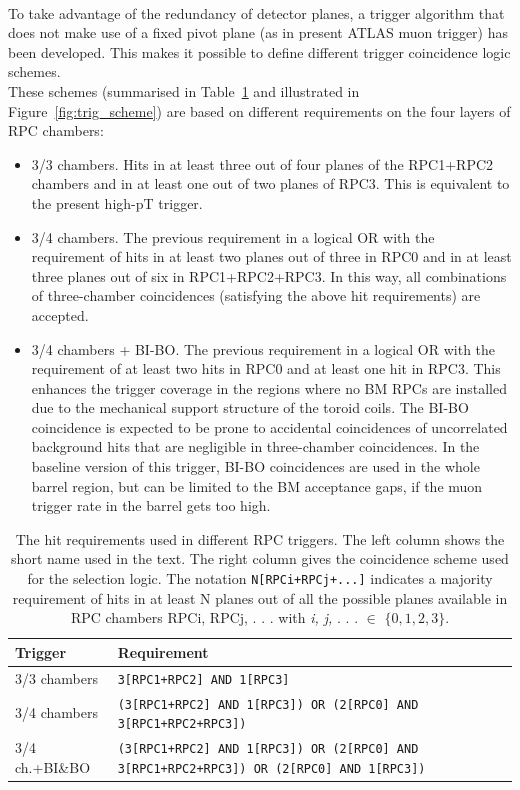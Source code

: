 \\To take advantage of the redundancy of detector planes, a trigger algorithm that does not
make use of a fixed pivot plane (as in present ATLAS muon trigger) has been developed.
This makes it possible to define different trigger coincidence logic schemes.\\ 
These schemes (summarised in Table~\ref{tab:trig_scheme} and illustrated in Figure~\ref{fig:trig_scheme}) are based on different requirements on the  four layers of RPC chambers:
\begin{itemize}
	\item 3/3 chambers. Hits in at least three out of four planes of the RPC1+RPC2 chambers
and in at least one out of two planes of RPC3. This is equivalent to the present high-pT
trigger.
	\item 3/4 chambers. The previous requirement in a logical OR with the requirement of
hits in at least two planes out of three in RPC0 and in at least three planes out of six
in RPC1+RPC2+RPC3. In this way, all combinations of three-chamber coincidences
(satisfying the above hit requirements) are accepted.
	\item 3/4 chambers + BI-BO. The previous requirement in a logical OR with the requirement
of at least two hits in RPC0 and at least one hit in RPC3. This enhances the
trigger coverage in the regions where no BM RPCs are installed due to the mechanical
support structure of the toroid coils. The BI-BO coincidence is expected to be
prone to accidental coincidences of uncorrelated background hits that are negligible
in three-chamber coincidences. In the baseline version of this trigger, BI-BO coincidences
are used in the whole barrel region, but can be limited to the BM acceptance
gaps, if the muon trigger rate in the barrel gets too high.
\end{itemize}
\begin{table}[h]
	\begin{center}
		\begin{tabular}{lp{}}
			\textbf{Trigger}  & \textbf{Requirement} \\
			\hline 
			3/3 chambers     & \scriptsize{\texttt{3[RPC1+RPC2] AND 1[RPC3]}} \\
			3/4 chambers     & \scriptsize{\texttt{(3[RPC1+RPC2] AND 1[RPC3]) OR (2[RPC0] AND 3[RPC1+RPC2+RPC3])}}\\
			3/4 ch.+BI\&BO    & \scriptsize{\texttt{(3[RPC1+RPC2] AND 1[RPC3]) OR (2[RPC0] AND 3[RPC1+RPC2+RPC3]) \hspace{2cm} OR (2[RPC0] AND 1[RPC3])}}\\
			\hline 
		\end{tabular} 
		\caption{The hit requirements used in different RPC triggers. The left column shows the short name used in the text. The right column gives the coincidence scheme used for the selection logic. The notation \texttt{N[RPCi+RPCj+...]} indicates a majority requirement of hits in at least N planes out of all the possible planes available in RPC chambers RPCi, RPCj, . . . with \textit{i, j,} . . . \textit{$\in$} $\{0, 1, 2, 3\}$.} 
		\label{tab:trig_scheme}
	\end{center} 
\end{table} 
